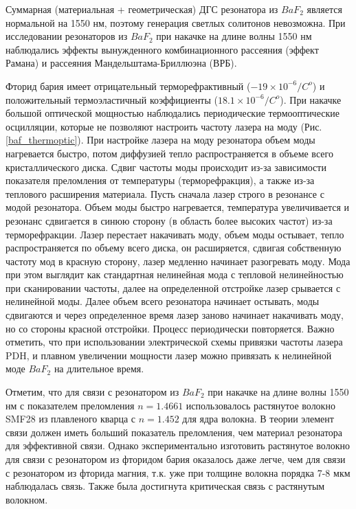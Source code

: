 Суммарная (материальная + геометрическая) ДГС резонатора из $BaF_2$ является нормальной на 1550 нм, поэтому генерация светлых солитонов невозможна. При исследовании резонаторов из $BaF_2$ при накачке на длине волны 1550 нм наблюдались эффекты вынужденного комбинационного рассеяния (эффект Рамана) и рассеяния Мандельштама-Бриллюэна (ВРБ).

Фторид бария имеет отрицательный терморефрактивный ($-19\times10^{-6}/C^{o}$) и положительный термоэластичный коэффициенты ($18.1\times10^{-6}/C^{o}$). При накачке большой оптической мощностью наблюдались периодические термооптические осцилляции, которые не позволяют настроить частоту лазера на моду (Рис. \ref{baf_thermoptic}). При настройке лазера на моду резонатора объем моды нагревается быстро, потом диффузией тепло распространяется в объеме всего кристаллического диска. Сдвиг частоты моды происходит из-за зависимости показателя преломления от температуры (терморефракция), а также из-за теплового расширения материала. Пусть сначала лазер строго в резонансе с модой резонатора. Объем моды быстро нагревается, температура увеличивается и резонанс сдвигается в синюю сторону (в область более высоких частот) из-за терморефракции. Лазер перестает накачивать моду, объем моды остывает, тепло распространяется по объему всего диска, он расширяется, сдвигая собственную частоту мод в красную сторону, лазер медленно начинает разогревать моду. Мода при этом выглядит как стандартная нелинейная мода с тепловой нелинейностью при сканировании частоты, далее на определенной отстройке лазер срывается с нелинейной моды. Далее объем всего резонатора начинает остывать, моды сдвигаются и через определенное время лазер заново начинает накачивать моду, но со стороны красной отстройки. Процесс периодически повторяется. Важно отметить, что при использовании электрической схемы привязки частоты лазера PDH, и плавном увеличении мощности лазер можно привязать к нелинейной моде $BaF_2$ на длительное время.

Отметим, что для связи с резонатором из $BaF_2$ при накачке на длине волны 1550 нм с показателем преломления $n=1.4661$ использовалось растянутое волокно SMF28 из плавленого кварца с $n=1.452$ для ядра волокна. В теории элемент связи должен иметь больший показатель преломления, чем материал резонатора для эффективной связи. Однако экспериментально изготовить растянутое волокно для связи с резонатором из фторидом бария оказалось даже легче, чем для связи с резонатором из фторида магния, т.к. уже при толщине волокна порядка 7-8 мкм наблюдалась связь. Также была достигнута критическая связь с растянутым волокном.

